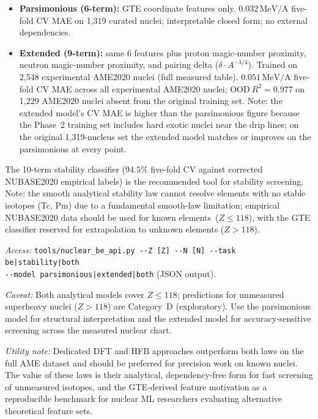 \documentclass[11pt]{article}
\begin{document}
\begin{itemize}[leftmargin=1.5em,itemsep=0.1em]
\item \textbf{Parsimonious (6-term):} GTE coordinate features only.
  $0.032\,\mathrm{MeV/A}$ five-fold CV MAE on 1,319 curated nuclei;
  interpretable closed form; no external dependencies.
\item \textbf{Extended (9-term):} same 6 features plus proton magic-number
  proximity, neutron magic-number proximity, and pairing delta
  ($\delta \cdot A^{-3/4}$).
  Trained on 2,548 experimental AME2020 nuclei (full measured table).
  $0.051\,\mathrm{MeV/A}$ five-fold CV MAE across all experimental AME2020
  nuclei; $\mathrm{OOD}\ R^2 = 0.977$ on 1,229 AME2020 nuclei absent from the
  original training set.
  Note: the extended model's CV MAE is higher than the parsimonious figure
  because the Phase~2 training set includes hard exotic nuclei near the drip
  lines; on the original 1,319-nucleus set the extended model matches or
  improves on the parsimonious at every point.
\end{itemize}

The 10-term stability classifier ($94.5\%$ five-fold CV against corrected NUBASE2020
empirical labels) is the recommended tool for stability screening. Note: the smooth
analytical stability law cannot resolve elements with no stable isotopes (Tc, Pm)
due to a fundamental smooth-law limitation; empirical NUBASE2020 data should be
used for known elements~($Z\leq 118$), with the GTE classifier reserved for
extrapolation to unknown elements ($Z>118$).

\emph{Access:}
\texttt{tools/nuclear\_be\_api.py -{}-Z [Z] -{}-N [N] -{}-task be|stability|both}\\
\texttt{\phantom{tools/nuclear\_be\_api.py }{}-{}-model parsimonious|extended|both} (JSON output).

\emph{Caveat:} Both analytical models cover $Z \leq 118$;
predictions for unmeasured superheavy nuclei ($Z > 118$) are Category~D (exploratory).
Use the parsimonious model for structural interpretation and the extended model
for accuracy-sensitive screening across the measured nuclear chart.

\emph{Utility note:} Dedicated DFT and HFB approaches outperform both laws on the full
AME dataset and should be preferred for precision work on known nuclei.
The value of these laws is their analytical, dependency-free form for fast screening
of unmeasured isotopes, and the GTE-derived feature motivation as a reproducible
benchmark for nuclear ML researchers evaluating alternative theoretical feature sets.
\end{document}
